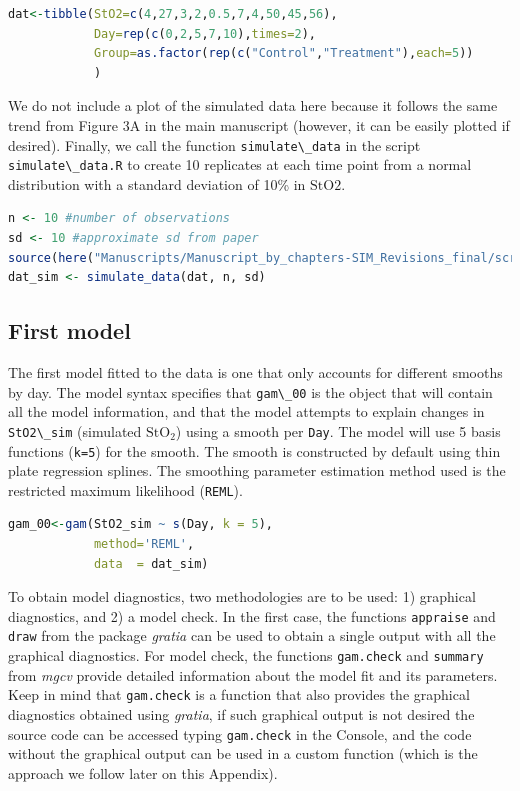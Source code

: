 \documentclass[
]{article}
\newcommand{\passthrough}[1]{#1}
\begin{document}
\begin{lstlisting}[language=R]
dat<-tibble(StO2=c(4,27,3,2,0.5,7,4,50,45,56),
            Day=rep(c(0,2,5,7,10),times=2),
            Group=as.factor(rep(c("Control","Treatment"),each=5))
            )
\end{lstlisting}

We do not include a plot of the simulated data here because it follows the same trend from Figure 3A in the main manuscript (however, it can be easily plotted if desired).
Finally, we call the function \passthrough{\lstinline!simulate\_data!} in the script \passthrough{\lstinline!simulate\_data.R!} to create 10 replicates at each time point from a normal distribution with a standard deviation of 10\% in \(\mbox{StO2}\).

\begin{lstlisting}[language=R]
n <- 10 #number of observations
sd <- 10 #approximate sd from paper
source(here("Manuscripts/Manuscript_by_chapters-SIM_Revisions_final/scripts","simulate_data.R"))
dat_sim <- simulate_data(dat, n, sd)
\end{lstlisting}

\hypertarget{first-model}{%
\subsection{First model}\label{first-model}}

The first model fitted to the data is one that only accounts for different smooths by day. The model syntax specifies that \passthrough{\lstinline!gam\_00!} is the object that will contain all the model information, and that the model attempts to explain changes in \passthrough{\lstinline!StO2\_sim!} (simulated \(\mbox{StO}_2\)) using a smooth per \passthrough{\lstinline!Day!}. The model will use 5 basis functions (\passthrough{\lstinline!k=5!}) for the smooth. The smooth is constructed by default using thin plate regression splines. The smoothing parameter estimation method used is the restricted maximum likelihood (\passthrough{\lstinline!REML!}).

\begin{lstlisting}[language=R]
gam_00<-gam(StO2_sim ~ s(Day, k = 5),
            method='REML',
            data  = dat_sim)
\end{lstlisting}

To obtain model diagnostics, two methodologies are to be used: 1) graphical diagnostics, and 2) a model check. In the first case, the functions \passthrough{\lstinline!appraise!} and \passthrough{\lstinline!draw!} from the package \emph{gratia} can be used to obtain a single output with all the graphical diagnostics. For model check, the functions \passthrough{\lstinline!gam.check!} and \passthrough{\lstinline!summary!} from \emph{mgcv} provide detailed information about the model fit and its parameters. Keep in mind that \passthrough{\lstinline!gam.check!} is a function that also provides the graphical diagnostics obtained using \emph{gratia}, if such graphical output is not desired the source code can be accessed typing \passthrough{\lstinline!gam.check!} in the Console, and the code without the graphical output can be used in a custom function (which is the approach we follow later on this Appendix).
\end{document}
